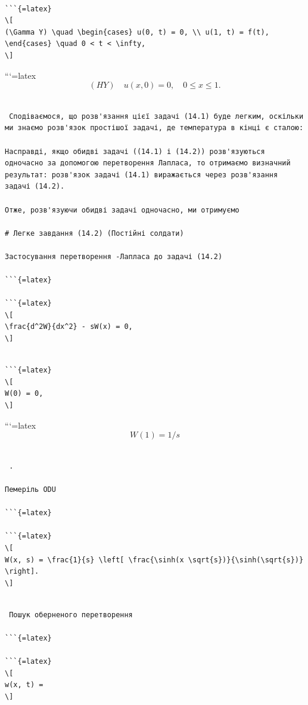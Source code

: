 \documentclass[
  ukrainian,
]{article}
\begin{document}
\begin{verbatim}

```{=latex}
\[
(\Gamma Y) \quad \begin{cases} u(0, t) = 0, \\ u(1, t) = f(t), \end{cases} \quad 0 < t < \infty,
\]
\end{verbatim}

```{=latex}
\[
(HY) \quad u(x, 0) = 0, \quad 0 \le x \le 1.
\]

\begin{verbatim}

 Сподіваємося, що розв'язання цієї задачі (14.1) буде легким, оскільки ми знаємо розв'язок простішої задачі, де температура в кінці є сталою:

Насправді, якщо обидві задачі ((14.1) і (14.2)) розв'язуються одночасно за допомогою перетворення Лапласа, то отримаємо визначний результат: розв'язок задачі (14.1) виражається через розв'язання задачі (14.2).

Отже, розв'язуючи обидві задачі одночасно, ми отримуємо

# Легке завдання (14.2) (Постійні солдати)

Застосування перетворення -Лапласа до задачі (14.2)

```{=latex}

```{=latex}
\[
\frac{d^2W}{dx^2} - sW(x) = 0,
\]
\end{verbatim}

\begin{verbatim}

```{=latex}
\[
W(0) = 0,
\]
\end{verbatim}

```{=latex}
\[
W(1) = 1/s
\]

\begin{verbatim}

 .

Пемеріль ODU

```{=latex}

```{=latex}
\[
W(x, s) = \frac{1}{s} \left[ \frac{\sinh(x \sqrt{s})}{\sinh(\sqrt{s})} \right].
\]
\end{verbatim}

\begin{verbatim}

 Пошук оберненого перетворення

```{=latex}

```{=latex}
\[
w(x, t) =
\]
\end{verbatim}
\end{document}
